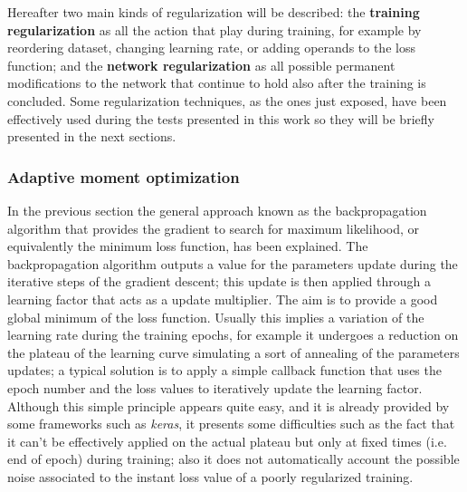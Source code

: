 Hereafter two main kinds of regularization will be described: the \textbf{training regularization} as all the action that play during training, for example by reordering dataset, changing learning rate, or adding operands to the loss function; and the \textbf{network regularization} as all possible permanent modifications to the network that continue to hold also after the training is concluded.
Some regularization techniques, as the ones just exposed, have been effectively used during the tests presented in this work so they will be briefly presented in the next sections.

\subsubsection{Adaptive moment optimization}
In the previous section the general approach known as the backpropagation algorithm that provides the gradient to search for maximum likelihood, or equivalently the minimum loss function, has been explained. 
The backpropagation algorithm outputs a value for the parameters update during the iterative steps of the gradient descent; this update is then applied through a learning factor that acts as a update multiplier. The aim is to provide a good global minimum of the loss function.
Usually this implies a variation of the learning rate during the training epochs, for example it undergoes a reduction on the plateau of the learning curve simulating a sort of annealing of the parameters updates; a typical solution is to apply a simple callback function that uses the epoch number and the loss values to iteratively update the learning factor.
Although this simple principle appears quite easy, and it is already provided by some frameworks such as \textit{keras}, it presents some difficulties such as the fact that it can't be effectively applied on the actual plateau but only at fixed times (i.e. end of epoch) during training; also it does not automatically account the possible noise associated to the instant loss value of a poorly regularized training.


